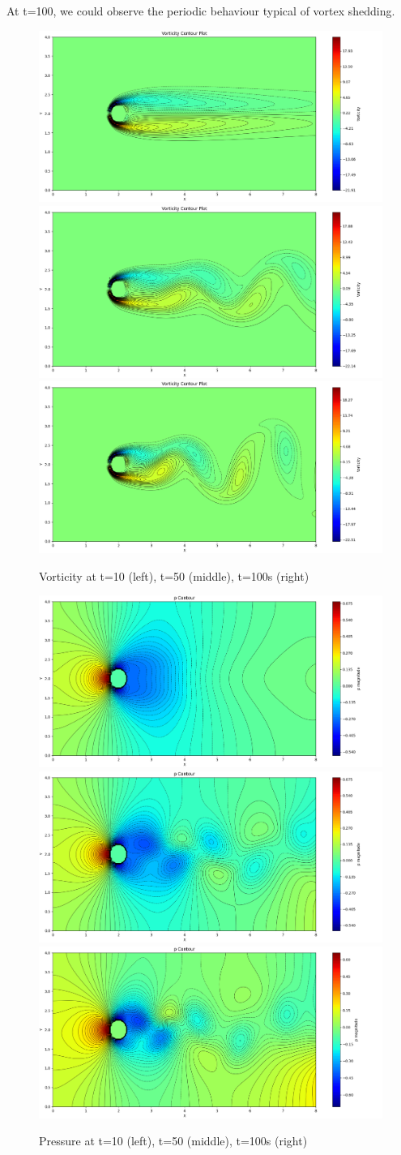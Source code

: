 \documentclass[12pt]{article}
\begin{document}
At t=100, we could observe the periodic behaviour typical of vortex shedding. 





\begin{figure}[H]
    \centering
    \includegraphics[width=0.3\linewidth]{figure/N32_Re150_8x4_t10/vor_N32_Re150_8x4_t10.jpg}
    \includegraphics[width=0.3\linewidth]{figure/N32_Re150_8x4_t50/vor_N32_Re150_8x4_t50.jpg}
    \includegraphics[width=0.3\linewidth]{figure/N32_Re150_8x4_t100/vor_N32_Re150_8x4_t100.jpg}
    \caption{Vorticity at t=10 (left), t=50 (middle), t=100s (right)}
\end{figure}


\begin{figure}[H]
    \centering
    \includegraphics[width=0.3\linewidth]{figure/N32_Re150_8x4_t10/p_N32_Re150_8x4_t10.jpg}
    \includegraphics[width=0.3\linewidth]{figure/N32_Re150_8x4_t50/p_N32_Re150_8x4_t50.jpg}
    \includegraphics[width=0.3\linewidth]{figure/N32_Re150_8x4_t100/p_N32_Re150_8x4_t100.jpg}
    \caption{Pressure at t=10 (left), t=50 (middle), t=100s (right)}
\end{figure}
\end{document}
